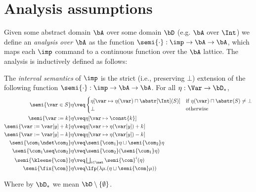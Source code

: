 \section{Analysis assumptions}
\label{sec:assumptions}


Given some abstract domain \(\bA\) over some domain \(\bD\)
(e.g. \(\bA\) over \(\Int\)) we define an \emph{analysis over} \(\bA\)
as the function \(\semi{\cdot} : \imp \to \bA \to \bA\), which maps
each \(\imp\) command to a continuous function over the \(\bA\)
lattice.  The analysis is inductively defined as follows:

\begin{definition}\label{de:ainterpret}
  The \emph{interval semantics} of \(\imp\) is the strict (i.e.,
  preserving \(\bot\))
  extension of the following function
  \(\semi{\cdot}: \imp \to \bA \to \bA\). For all
  \(\eta: \Var \to \bD_*\),
  \begin{align*}
    \semi{\var \in S}\eta 
    & \veq  
      \begin{cases}
        \eta[\var \mapsto \eta(\var)\sqcap \abstr[\Int](S)] & \text{if }\eta(\var)\sqcap \abstr(S)\neq \bot \\
        \bot & \text{otherwise}
      \end{cases}\\
    \semi{\var := k}\eta 
    & \veq \eta[\var \mapsto \const{k}]\\
    \semi{\var := \var[y] + k}\eta 
    & \veq \eta[\var \mapsto \eta (\var[y]) + k]\\
    \semi{\var := \var[y] - k}\eta 
    & \veq \eta[\var \mapsto \eta (\var[y]) - k]\\
    \semi{\com_1 \ndet \com_2} \eta
    & \veq \semi{\com_1} \eta \sqcup \semi{\com_2} \eta\\
    \semi{\com_1 \seq \com_2} \eta
    & \veq \semi{\com_2} (\semi{\com_1} \eta)\\
    \semi{\kleene{\com}} \eta
    & \veq \textstyle \bigsqcup_{i \in \nat} \semi{\com}^i (\eta)\\
    \semi{\fix{\com}} \eta
    & \veq  \lfp(\lambda \mu. (\eta \sqcup \semi{\com} \mu))
  \end{align*}

  Where by \(\bD_*\) we mean \(\bD \setminus \{\emptyset\}\).
\end{definition}

